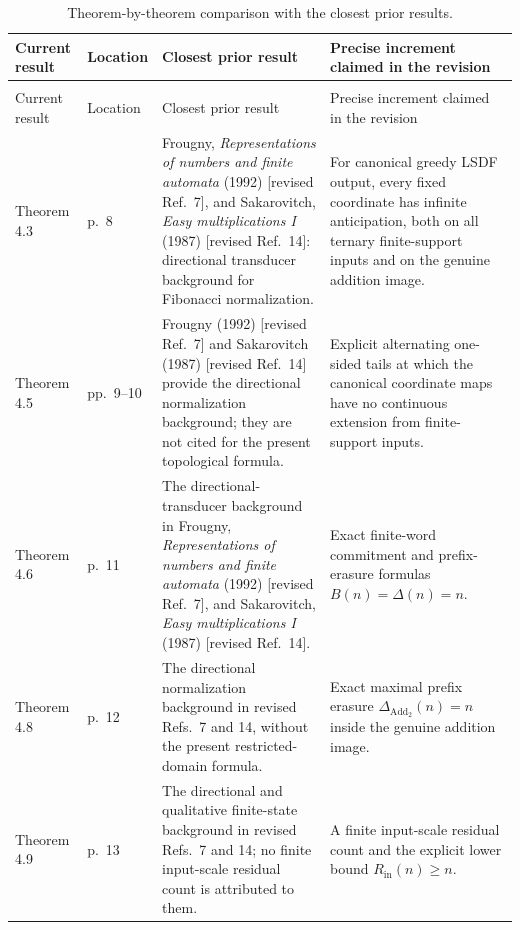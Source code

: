 \documentclass[11pt]{article}
\begin{document}
\small
\begin{longtable}{>{\raggedright\arraybackslash}p{}
                  >{\raggedright\arraybackslash}p{}
                  >{\raggedright\arraybackslash}p{}
                  >{\raggedright\arraybackslash}p{}}
\caption{Theorem-by-theorem comparison with the closest prior results.}
\label{tab:response-comparison}\\
\hline
Current result & Location & Closest prior result & Precise increment claimed in the revision\\
\hline
\endfirsthead
\multicolumn{4}{l}{\small Table~\thetable\ continued from the preceding page.}\\
\hline
Current result & Location & Closest prior result & Precise increment claimed in the revision\\
\hline
\endhead
Theorem 4.3
& p.~8
& Frougny, \emph{Representations of numbers and finite automata} (1992)
[revised Ref.~7], and Sakarovitch, \emph{Easy multiplications I} (1987)
[revised Ref.~14]: directional transducer background for Fibonacci
normalization.
& For canonical greedy LSDF output, every fixed coordinate has infinite
anticipation, both on all ternary finite-support inputs and on the genuine
addition image.\\
Theorem 4.5
& pp.~9--10
& Frougny (1992) [revised Ref.~7] and Sakarovitch (1987) [revised Ref.~14]
provide the directional normalization background; they are not cited for the
present topological formula.
& Explicit alternating one-sided tails at which the canonical coordinate maps
have no continuous extension from finite-support inputs.\\
Theorem 4.6
& p.~11
& The directional-transducer background in Frougny,
\emph{Representations of numbers and finite automata} (1992) [revised Ref.~7],
and Sakarovitch, \emph{Easy multiplications I} (1987) [revised Ref.~14].
& Exact finite-word commitment and prefix-erasure formulas
$B(n)=\Delta(n)=n$.\\
Theorem 4.8
& p.~12
& The directional normalization background in revised Refs.~7 and 14, without
the present restricted-domain formula.
& Exact maximal prefix erasure
$\Delta_{\operatorname{Add}_2}(n)=n$ inside the genuine addition image.\\
Theorem 4.9
& p.~13
& The directional and qualitative finite-state background in revised
Refs.~7 and 14; no finite input-scale residual count is attributed to them.
& A finite input-scale residual count and the explicit lower bound
$R_{\mathrm{in}}(n)\ge n$.\\

\end{longtable}
\end{document}
